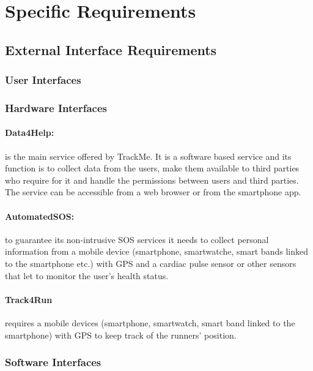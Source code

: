 \documentclass[a4paper]{article}
\begin{document}
    
    \section{Specific Requirements}
    
    \subsection{External Interface Requirements}
    
    \subsubsection{User Interfaces}
    
    
    
    \subsubsection{Hardware Interfaces}
    
    \paragraph{Data4Help:} is the main service offered by TrackMe. It is a software based service and its function is to collect data from the users, make them available to third parties who require for it and handle the permissions between users and third parties. The service can be accessible from a web browser or from the smartphone app.
    
    \paragraph{AutomatedSOS:} to guarantee its non-intrusive SOS services it needs to collect personal information from a mobile device (smartphone, smartwatche, smart bands linked to the smartphone etc.) with GPS and a cardiac pulse sensor or other sensors that let to monitor the user's health status.
    
    \paragraph{Track4Run} requires a mobile devices (smartphone, smartwatch, smart band linked to the smartphone) with GPS to keep track of the runners' position.
    
    \subsubsection{Software Interfaces}
    
\end{document}
